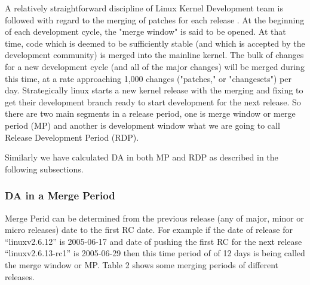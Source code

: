 \documentclass{acm_proc_article-sp}
\begin{document}
A relatively straightforward discipline of Linux Kernel Development team is followed with regard to the merging of patches for each release \cite{linux_kernel}.  At the beginning of each development cycle, the "merge window" is said to be opened.  At that time, code which is deemed to be sufficiently stable (and which is accepted by the development community) is merged into the mainline kernel. The bulk of changes for a new development cycle (and all of the major changes) will be merged during this time, at a rate approaching 1,000 changes ("patches," or "changesets") per day. Strategically linux starts a new kernel release with the merging and fixing to get their development branch ready to start development for the next release. So there are two main segments in a release period, one is merge window or merge period (MP) and another is development window what we are going to call Release Development Period (RDP).

Similarly we have calculated DA in both MP and RDP as described in the following subsections.

\subsubsection{DA in a Merge Period}
Merge Perid can be determined from the previous release (any of major, minor or micro releases) date to the first RC date. For example if the date of release for ``linuxv2.6.12''  is 2005-06-17 and date of pushing the first RC for the next release ``linuxv2.6.13-rc1'' is 2005-06-29 then this time period of of 12 days is being called the merge window \cite{14_kernel} or MP. Table 2 shows some merging periods of different releases.
\end{document}
